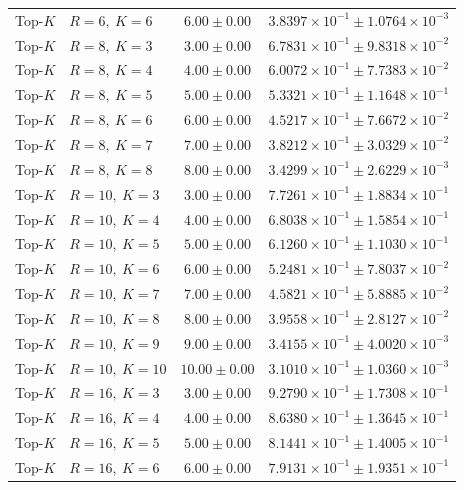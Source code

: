 \begin{table}[t]
\begin{tabular}{@{}llcc@{}}
Top-\(K\) & \(R=6,\ K=6\) & \(6.00 \pm 0.00\) & \(3.8397{\times}10^{-1} \pm 1.0764{\times}10^{-3}\) \\
Top-\(K\) & \(R=8,\ K=3\) & \(3.00 \pm 0.00\) & \(6.7831{\times}10^{-1} \pm 9.8318{\times}10^{-2}\) \\
Top-\(K\) & \(R=8,\ K=4\) & \(4.00 \pm 0.00\) & \(6.0072{\times}10^{-1} \pm 7.7383{\times}10^{-2}\) \\
Top-\(K\) & \(R=8,\ K=5\) & \(5.00 \pm 0.00\) & \(5.3321{\times}10^{-1} \pm 1.1648{\times}10^{-1}\) \\
Top-\(K\) & \(R=8,\ K=6\) & \(6.00 \pm 0.00\) & \(4.5217{\times}10^{-1} \pm 7.6672{\times}10^{-2}\) \\
Top-\(K\) & \(R=8,\ K=7\) & \(7.00 \pm 0.00\) & \(3.8212{\times}10^{-1} \pm 3.0329{\times}10^{-2}\) \\
Top-\(K\) & \(R=8,\ K=8\) & \(8.00 \pm 0.00\) & \(3.4299{\times}10^{-1} \pm 2.6229{\times}10^{-3}\) \\
Top-\(K\) & \(R=10,\ K=3\) & \(3.00 \pm 0.00\) & \(7.7261{\times}10^{-1} \pm 1.8834{\times}10^{-1}\) \\
Top-\(K\) & \(R=10,\ K=4\) & \(4.00 \pm 0.00\) & \(6.8038{\times}10^{-1} \pm 1.5854{\times}10^{-1}\) \\
Top-\(K\) & \(R=10,\ K=5\) & \(5.00 \pm 0.00\) & \(6.1260{\times}10^{-1} \pm 1.1030{\times}10^{-1}\) \\
Top-\(K\) & \(R=10,\ K=6\) & \(6.00 \pm 0.00\) & \(5.2481{\times}10^{-1} \pm 7.8037{\times}10^{-2}\) \\
Top-\(K\) & \(R=10,\ K=7\) & \(7.00 \pm 0.00\) & \(4.5821{\times}10^{-1} \pm 5.8885{\times}10^{-2}\) \\
Top-\(K\) & \(R=10,\ K=8\) & \(8.00 \pm 0.00\) & \(3.9558{\times}10^{-1} \pm 2.8127{\times}10^{-2}\) \\
Top-\(K\) & \(R=10,\ K=9\) & \(9.00 \pm 0.00\) & \(3.4155{\times}10^{-1} \pm 4.0020{\times}10^{-3}\) \\
Top-\(K\) & \(R=10,\ K=10\) & \(10.00 \pm 0.00\) & \(3.1010{\times}10^{-1} \pm 1.0360{\times}10^{-3}\) \\
Top-\(K\) & \(R=16,\ K=3\) & \(3.00 \pm 0.00\) & \(9.2790{\times}10^{-1} \pm 1.7308{\times}10^{-1}\) \\
Top-\(K\) & \(R=16,\ K=4\) & \(4.00 \pm 0.00\) & \(8.6380{\times}10^{-1} \pm 1.3645{\times}10^{-1}\) \\
Top-\(K\) & \(R=16,\ K=5\) & \(5.00 \pm 0.00\) & \(8.1441{\times}10^{-1} \pm 1.4005{\times}10^{-1}\) \\
Top-\(K\) & \(R=16,\ K=6\) & \(6.00 \pm 0.00\) & \(7.9131{\times}10^{-1} \pm 1.9351{\times}10^{-1}\) \\

\end{tabular}
\end{table}
